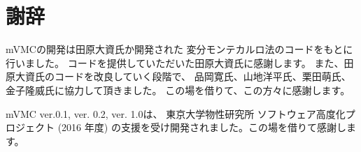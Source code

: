\chapter{謝辞}
\label{Ch:ack}
mVMCの開発は田原大資氏か開発された
変分モンテカルロ法のコードをもとに行いました。
コードを提供していただいた田原大資氏に感謝します。
また、田原大資氏のコードを改良していく段階で、
品岡寛氏、山地洋平氏、栗田萌氏、金子隆威氏に協力して頂きました。
この場を借りて、この方々に感謝します。

mVMC ver.0.1, ver. 0.2, ver. 1.0は、
東京大学物性研究所 ソフトウェア高度化プロジェクト (2016 年度)
の支援を受け開発されました。この場を借りて感謝します。
